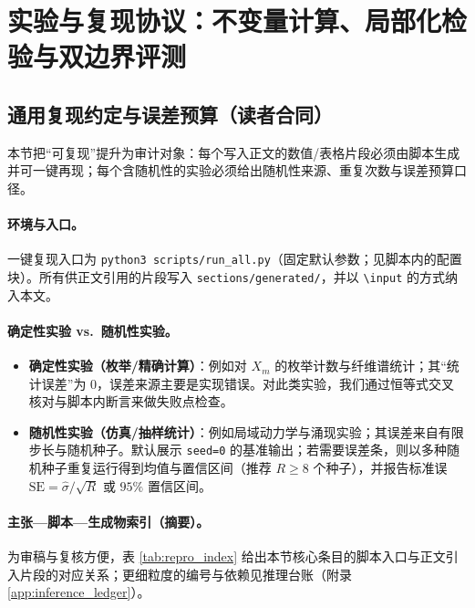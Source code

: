 \section{实验与复现协议：不变量计算、局部化检验与双边界评测}

\subsection{通用复现约定与误差预算（读者合同）}

\AuditTag 本节把“可复现”提升为审计对象：每个写入正文的数值/表格片段必须由脚本生成并可一键再现；每个含随机性的实验必须给出随机性来源、重复次数与误差预算口径。

\paragraph{环境与入口。}
一键复现入口为 \texttt{python3 scripts/run\_all.py}（固定默认参数；见脚本内的配置块）。所有供正文引用的片段写入 \texttt{sections/generated/}，并以 \texttt{\textbackslash input} 的方式纳入本文。

\paragraph{确定性实验 vs.\ 随机性实验。}
\begin{itemize}
  \item \textbf{确定性实验（枚举/精确计算）}：例如对 $X_m$ 的枚举计数与纤维谱统计；其“统计误差”为 $0$，误差来源主要是实现错误。对此类实验，我们通过恒等式交叉核对与脚本内断言来做失败点检查。
  \item \textbf{随机性实验（仿真/抽样统计）}：例如局域动力学与涌现实验；其误差来自有限步长与随机种子。默认展示 \texttt{seed=0} 的基准输出；若需要误差条，则以多种随机种子重复运行得到均值与置信区间（推荐 $R\ge 8$ 个种子），并报告标准误 $\mathrm{SE}=\hat\sigma/\sqrt{R}$ 或 $95\%$ 置信区间。
\end{itemize}

\paragraph{主张—脚本—生成物索引（摘要）。}
\AuditTag 为审稿与复核方便，表 \ref{tab:repro_index} 给出本节核心条目的脚本入口与正文引入片段的对应关系；更细粒度的编号与依赖见推理台账（附录 \ref{app:inference_ledger}）。

